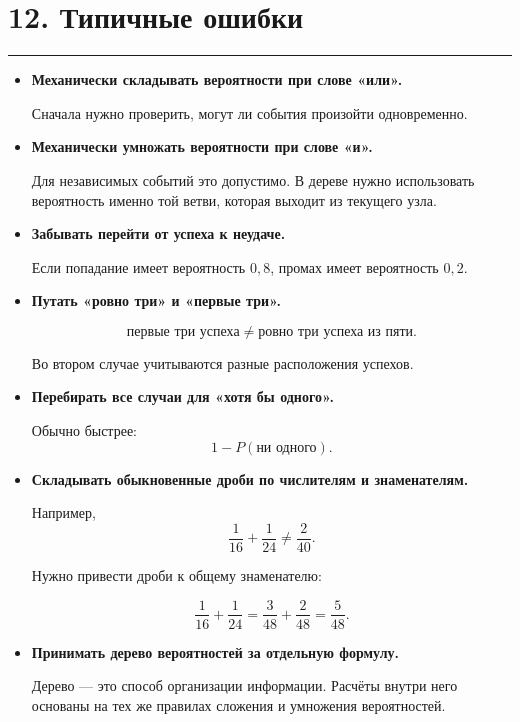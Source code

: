 \documentclass[a4paper,12pt]{article}
\newcommand{\accentline}{%
    \vspace{0.3em}
    {\color{accent}\rule{\linewidth}{0.7pt}}
    \vspace{0.5em}
}
\newcommand{\important}[1]{\textbf{\color{darkaccent}#1}}
\begin{document}

\section*{\color{darkaccent}12. Типичные ошибки}
\accentline

\begin{itemize}

    \item \important{Механически складывать вероятности при слове «или».}

    Сначала нужно проверить, могут ли события произойти одновременно.

    \item \important{Механически умножать вероятности при слове «и».}

    Для независимых событий это допустимо. В дереве нужно использовать
    вероятность именно той ветви, которая выходит из текущего узла.

    \item \important{Забывать перейти от успеха к неудаче.}

    Если попадание имеет вероятность $0,8$, промах имеет вероятность
    $0,2$.

    \item \important{Путать «ровно три» и «первые три».}

    \[
    \text{первые три успеха}
    \neq
    \text{ровно три успеха из пяти}.
    \]

    Во втором случае учитываются разные расположения успехов.

    \item \important{Перебирать все случаи для «хотя бы одного».}

    Обычно быстрее:
    \[
    1-P(\text{ни одного}).
    \]

    \item \important{Складывать обыкновенные дроби по числителям и
    знаменателям.}

    Например,
    \[
    \frac1{16}+\frac1{24}
    \neq
    \frac2{40}.
    \]

    Нужно привести дроби к общему знаменателю:

    \[
    \frac1{16}+\frac1{24}
    =
    \frac3{48}+\frac2{48}
    =
    \frac5{48}.
    \]

    \item \important{Принимать дерево вероятностей за отдельную формулу.}

    Дерево --- это способ организации информации. Расчёты внутри него
    основаны на тех же правилах сложения и умножения вероятностей.

\end{itemize}
\end{document}
